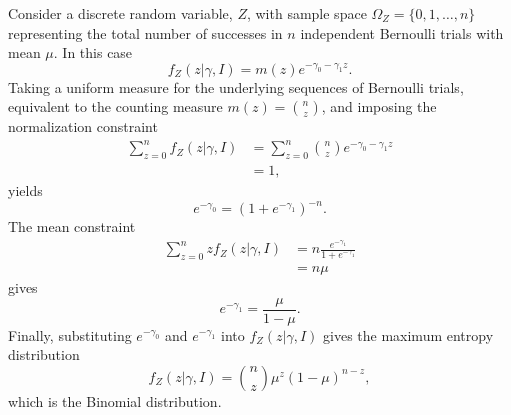 \begin{example}
	Consider a discrete random variable, $Z$, with sample space $\Omega_Z = \{0,1,\dots,n\}$ representing the total number of successes in $n$ independent Bernoulli trials with mean $\mu$. In this case
	\begin{equation}
		f_Z(z|\gamma,I) = m(z) e^{-\gamma_0 - \gamma_1 z}.
	\end{equation}
	Taking a uniform measure for the underlying sequences of Bernoulli trials, equivalent to the counting measure $m(z) = \binom{n}{z}$, and imposing the normalization constraint
	\begin{equation}
		\begin{split}
			\sum_{z=0}^n f_Z(z|\gamma,I) &= \sum_{z=0}^n \binom{n}{z} e^{-\gamma_0 - \gamma_1 z}\\
			& = 1,
		\end{split}
	\end{equation}
	yields
	\begin{equation}
		e^{-\gamma_0} = (1 + e^{-\gamma_1})^{-n}.
	\end{equation}
	The mean constraint
	\begin{equation}
		\begin{split}
			\sum_{z=0}^n z f_Z(z|\gamma,I) &= n \frac{e^{-\gamma_1}}{1 + e^{-\gamma_1}}\\
			& = n\mu
		\end{split}
	\end{equation}
	gives
	\begin{equation}
		e^{-\gamma_1} = \frac{\mu}{1-\mu}.
	\end{equation}
	Finally, substituting $e^{-\gamma_0}$ and $e^{-\gamma_1}$ into $f_Z(z|\gamma,I)$ gives the maximum entropy distribution
	\begin{equation}
		f_Z(z|\gamma,I) = \binom{n}{z} \mu^z (1-\mu)^{n-z},
	\end{equation}
	which is the Binomial distribution.
\end{example}


